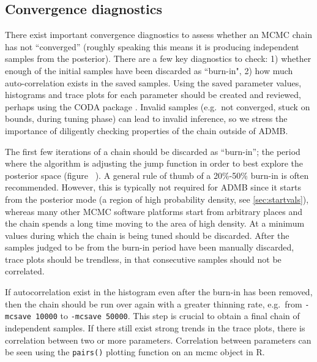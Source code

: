 \documentclass{article}\usepackage[]{graphicx}\usepackage[]{color}
\begin{document}
\subsection{Convergence diagnostics} \label{sec:diag}

There exist important convergence diagnostics to assess whether an MCMC
chain has not ``converged'' (roughly speaking this means it is producing
independent samples from the posterior). There are a few key diagnostics to
check: 1) whether enough of the initial samples have been discarded as
``burn-in", 2) how much auto-correlation exists in the saved samples. Using
the saved parameter values, histograms and trace plots for each parameter
should be created and reviewed, perhaps using the CODA package
\cite{plummer2006}. Invalid samples (e.g.\ not converged, stuck on bounds,
during tuning phase) can lead to invalid inference, so we stress the
importance of diligently checking properties of the chain outside of ADMB.


The first few iterations of a chain should be discarded as ``burn-in''; the
period where the algorithm is adjusting the jump function in order to best
explore the posterior space (figure ~). A general rule of thumb of a
20\%-50\% burn-in is often recommended. However, this is typically not
required for ADMB since it starts from the posterior mode (a region of high
probability density, see \ref{sec:startvals}), whereas many other MCMC
software platforms start from arbitrary places and the chain spends a long
time moving to the area of high density. At a minimum values during which
the chain is being tuned should be discarded.  After the samples judged to
be from the burn-in period have been manually discarded, trace plots should
be trendless, in that consecutive samples should not be correlated.

If autocorrelation exist in the histogram even after the burn-in has been
removed, then the chain should be run over again with a greater thinning
rate, e.g.\ from \texttt{-mcsave 10000} to \texttt{-mcsave 50000}.  This
step is crucial to obtain a final chain of independent samples. If there
still exist strong trends in the trace plots, there is correlation between
two or more parameters. Correlation between parameters can be seen using
the \texttt{pairs()} plotting function on an mcmc object in R.
\end{document}
